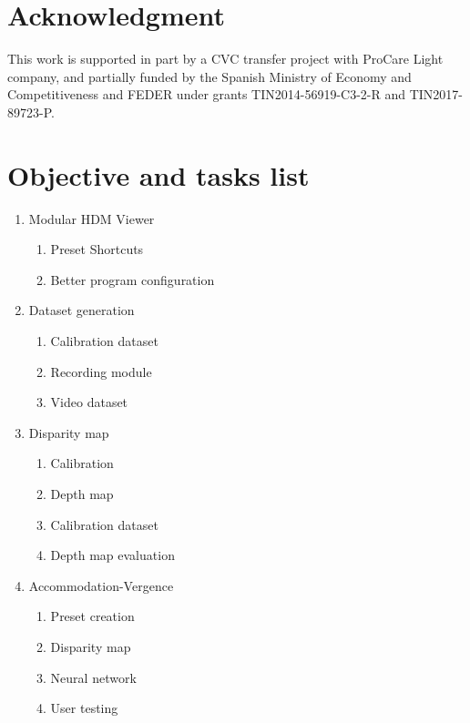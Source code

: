 \documentclass[10pt,a4paper,twocolumn,twoside]{article}
\begin{document}
	\section{Acknowledgment}
	This work is supported in part by a CVC transfer project with ProCare Light company, and partially funded by the Spanish Ministry of Economy and Competitiveness and FEDER under grants TIN2014-56919-C3-2-R and TIN2017-89723-P.
	
	
	

	\pagebreak	
	\appendix

	\section{Objective and tasks list}
	\begin{enumerate}
		\item \label{obj:viewer} Modular HDM Viewer 
		\begin{enumerate}
			\item Preset Shortcuts
			\item Better program configuration
		\end{enumerate}
	
		\item Dataset generation
		\begin{enumerate}
			\item Calibration dataset
			\item \label{obj:dataset:record} Recording module
			\item \label{obj:dataset:video} Video dataset
		\end{enumerate}
	
		\item \label{obj:dispmap} Disparity map
		\begin{enumerate}
			\item Calibration
			\item Depth map
			\item Calibration dataset
			\item \label{obj:dispmap:eval} Depth map evaluation
		\end{enumerate}
	
		\item Accommodation-Vergence
		\begin{enumerate}
			\item Preset creation
			\item Disparity map
			\item Neural network
			\item User testing
		\end{enumerate}
	

\end{enumerate}
\end{document}
